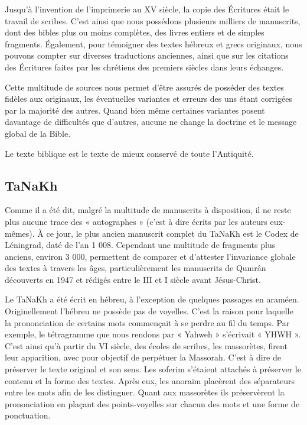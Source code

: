 \begin{small}
Jusqu'à l'invention de l'imprimerie au XV siècle, la copie des Écritures était le travail de scribes. C'est ainsi que nous possédons plusieurs milliers de manuscrits, dont des bibles plus ou moins complètes, des livres entiers et de simples fragments. Également, pour témoigner des textes hébreux et grecs originaux, nous pouvons compter sur diverses traductions anciennes, ainsi que sur les citations des Écritures faites par les chrétiens des premiers siècles dans leurs échanges.\bigskip

Cette multitude de sources nous permet d'être assurés de posséder des textes fidèles aux originaux, les éventuelles variantes et erreurs des uns étant corrigées par la majorité des autres. Quand bien même certaines variantes posent davantage de difficultés que d'autres, aucune ne change la doctrine et le message global de la Bible.\bigskip

Le texte biblique est le texte de mieux conservé de toute l'Antiquité.

\subsection*{TaNaKh}

Comme il a été dit, malgré la multitude de manuscrits à disposition, il ne reste plus aucune trace des « autographes » (c'est à dire écrits par les auteurs eux-mêmes). À ce jour, le plus ancien manuscrit complet du TaNaKh est le Codex de Léningrad, daté de l'an 1 008. Cependant une multitude de fragments plus anciens, environ 3 000, permettent de comparer et d'attester l'invariance globale des textes à travers les âges, particulièrement les manuscrits de Qumrân découverts en 1947 et rédigés entre le III et I siècle avant Jésus-Christ.\bigskip

Le TaNaKh a été écrit en hébreu, à l'exception de quelques passages en araméen. Originellement l'hébreu ne possède pas de voyelles. C'est la raison pour laquelle la prononciation de certains mots commençait à se perdre au fil du temps. Par exemple, le tétragramme que nous rendons par « Yahweh » s'écrivait « YHWH ». C'est ainsi qu'à partir du VI siècle, des écoles de scribes, les massorètes, firent leur apparition, avec pour objectif de perpétuer la Massorah. C'est à dire de préserver le texte original et son sens. Les soferim s'étaient attachés à préserver le contenu et la forme des textes. Après eux, les anoraïm placèrent des séparateurs entre les mots afin de les distinguer. Quant aux massorètes ils préservèrent la prononciation en plaçant des points-voyelles sur chacun des mots et une forme de ponctuation.\bigskip


\end{small}
